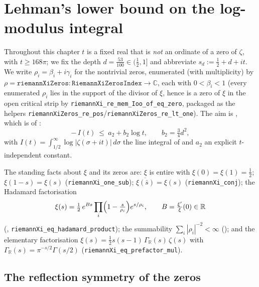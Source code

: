 %

\chapter{Lehman's lower bound on the log-modulus integral}
\label{cha:lehman_lower}

Throughout this chapter $t$ is a fixed real that is \emph{not} an ordinate of a zero
of $\zeta$, with $t\ge168\pi$; we fix the depth $d=\tfrac{53}{100}\in(\tfrac12,1]$ and
abbreviate $s_d:=\tfrac12+d+it$. We write $\rho_i=\beta_i+i\gamma_i$ for the
nontrivial zeros, enumerated (with multiplicity) by
$\rho=\texttt{riemannXiZeros}:\texttt{RiemannXiZerosIndex}\to\mathbb C$, each with
$0<\beta_i<1$ (every enumerated $\rho_i$ lies in the support of the divisor of $\xi$,
hence is a zero of $\xi$ in the open critical strip by
\texttt{riemannXi\_re\_mem\_Ioo\_of\_eq\_zero}, packaged as the helpers
\texttt{riemannXiZeros\_re\_pos}/\texttt{riemannXiZeros\_re\_lt\_one}). The aim is
, which is  of :
\[
  -\,I(t)\ \le\ a_2+b_2\log t,\qquad b_2=\tfrac34 d^2,
\]
with $I(t)=\int_{1/2}^\infty\log|\zeta(\sigma+it)|\,d\sigma$ the line integral of
 and $a_2$ an explicit $t$-independent constant.

The standing facts about $\xi$ and its zeros are: $\xi$ is
entire with $\xi(0)=\xi(1)=\tfrac12$; $\xi(1-s)=\xi(s)$
(\texttt{riemannXi\_one\_sub}); $\overline{\xi(\bar s)}=\xi(s)$
(\texttt{riemannXi\_conj}); the Hadamard factorisation
\[
  \xi(s)=\tfrac12\,e^{Bs}\prod_i\Bigl(1-\tfrac s{\rho_i}\Bigr)e^{s/\rho_i},
  \qquad B=\tfrac{\xi'}\xi(0)\in\mathbb R
\]
(, \texttt{riemannXi\_eq\_hadamard\_product}); the
summability $\sum_i|\rho_i|^{-2}<\infty$ (); and the
elementary factorisation $\xi(s)=\tfrac12 s(s-1)\,\Gamma_{\mathbb R}(s)\,\zeta(s)$
with $\Gamma_{\mathbb R}(s)=\pi^{-s/2}\Gamma(s/2)$
(\texttt{riemannXi\_eq\_prefactor\_mul}).

\section{The reflection symmetry of the zeros}
\label{sec:ll_reflection}

